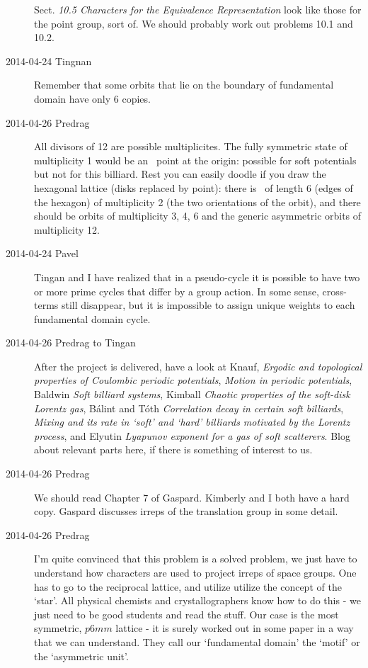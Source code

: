 \documentclass[pre,preprint,groupedaddress,showpacs,showkeys]{revtex4}
\begin{document}
\begin{description}
Sect. {\em 10.5 Characters for the Equivalence Representation} look
like those for the point group, sort of. We should probably work
out problems 10.1 and 10.2.

\item[2014-04-24 Tingnan]
Remember that some orbits that lie on the boundary of fundamental domain
have only 6 copies.

\item[2014-04-26 Predrag]
All divisors of 12 are possible multiplicites. The fully symmetric state
of multiplicity 1 would be an \eqv\ point at the origin: possible for
soft potentials but not for this billiard. Rest you can easily doodle if
you draw the hexagonal lattice (disks replaced by point): there is \po\
of length 6 (edges of the hexagon) of multiplicity 2 (the two
orientations of the orbit), and there should be orbits of multiplicity 3,
4, 6 and the generic asymmetric orbits of multiplicity 12.

\item[2014-04-24 Pavel]
Tingan and I have realized that in a
pseudo-cycle it is possible to have two or more prime cycles that differ
by a group action. In some sense, cross-terms still disappear, but it is
impossible to assign unique weights to each fundamental domain cycle.

\item[2014-04-26 Predrag to Tingan]
After the project is delivered,
have a look at
Knauf,
{\em Ergodic and topological properties of {Coulombic} periodic potentials},
{\em Motion in periodic potentials},
Baldwin {\em Soft billiard systems},
Kimball
{\em Chaotic properties of the soft-disk {Lorentz} gas},
B\'alint and T\'oth
{\em Correlation decay in certain soft billiards},
{\em Mixing and its rate in `soft' and `hard' billiards
         motivated by the {Lorentz} process},
and
Elyutin
{\em Lyapunov exponent for a gas of soft scatterers}.
Blog about relevant parts here, if there is something of interest
to us.

\item[2014-04-26 Predrag] We should read Chapter 7 of Gaspard.
Kimberly and I both have a hard copy. Gaspard discusses irreps of
the translation group in some detail.

\item[2014-04-26 Predrag]
I'm quite convinced that this problem is a solved problem, we just have
to understand how characters are used to project irreps of space groups.
One has to go to the reciprocal lattice, and utilize utilize the concept
of the `star'. All physical chemists and crystallographers know how to do
this - we just need to be good students and read the stuff. Our case is
the most symmetric, $p6mm$ lattice - it is surely worked out in some
paper in a way that we can understand. They call our `fundamental domain'
the `motif' or the `asymmetric unit'.


\end{description}
\end{document}
